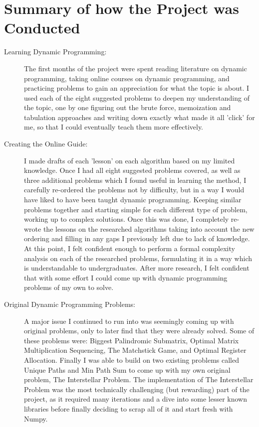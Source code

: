 \section{Summary of how the Project was Conducted}
\begin{description}
    \item[Learning Dynamic Programming:]
    The first months of the project were spent reading literature on dynamic programming, taking online courses on dynamic programming, and practicing problems to gain an appreciation for what the topic is about.
    I used each of the eight suggested problems to deepen my understanding of the topic, one by one figuring out the brute force,
    memoization and tabulation approaches and writing down exactly what made it all 'click' for me,
    so that I could eventually teach them more effectively.

    \item[Creating the Online Guide:]
I made drafts of each 'lesson' on each algorithm based on my limited knowledge.
Once I had all eight suggested problems covered, as well as three additional problems which I found useful in learning the method,
I carefully re-ordered the problems not by difficulty, but in a way I would have liked to have been taught dynamic programming. Keeping similar problems together and starting simple for each different type of problem, working up to complex solutions.
Once this was done, I completely re-wrote the lessons on the researched algorithms taking into account the new ordering and filling in any gaps I previously left due to lack of knowledge.
At this point, I felt confident enough to perform a formal complexity analysis on each of the researched problems, formulating it in a way which is understandable to undergraduates.
After more research, I felt confident that with some effort I could come up with dynamic programming problems of my own to solve.

    \item[Original Dynamic Programming Problems:]
A major issue I continued to run into was seemingly coming up with original problems, only to later find that they were already solved.
Some of these problems were: Biggest Palindromic Submatrix, Optimal Matrix Multiplication Sequencing, The Matchstick Game, and Optimal Register Allocation.
Finally I was able to build on two existing problems called Unique Paths and Min Path Sum to come up with my own original problem, The Interstellar Problem.
The implementation of The Interstellar Problem was the most technically challenging (but rewarding) part of the project, as it required many iterations and a dive into some lesser known libraries before finally deciding to scrap all of it and start fresh with Numpy.


\end{description}
